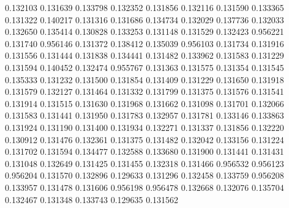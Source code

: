 0.132103
0.131639
0.133798
0.132352
0.131856
0.132116
0.131590
0.133365
0.131322
0.140217
0.131316
0.131686
0.134734
0.132029
0.137736
0.132033
0.132650
0.135414
0.130828
0.133253
0.131148
0.131529
0.132423
0.956221
0.131740
0.956146
0.131372
0.138412
0.135039
0.956103
0.131734
0.131916
0.131556
0.131444
0.131838
0.134441
0.131482
0.133962
0.131583
0.131229
0.131594
0.140452
0.132474
0.955767
0.131363
0.131575
0.131354
0.131545
0.135333
0.131232
0.131500
0.131854
0.131409
0.131229
0.131650
0.131918
0.131579
0.132127
0.131464
0.131332
0.131799
0.131375
0.131576
0.131541
0.131914
0.131515
0.131630
0.131968
0.131662
0.131098
0.131701
0.132066
0.131583
0.131441
0.131950
0.131783
0.132957
0.131781
0.133146
0.133863
0.131924
0.131190
0.131400
0.131934
0.132271
0.131337
0.131856
0.132220
0.130912
0.131476
0.132361
0.131375
0.131482
0.132042
0.133156
0.131224
0.131702
0.131594
0.134477
0.132588
0.133680
0.131900
0.131441
0.131431
0.131048
0.132649
0.131425
0.131455
0.132318
0.131466
0.956532
0.956123
0.956204
0.131570
0.132896
0.129633
0.131296
0.132458
0.133759
0.956208
0.133957
0.131478
0.131606
0.956198
0.956478
0.132668
0.132076
0.135704
0.132467
0.131348
0.133743
0.129635
0.131562
